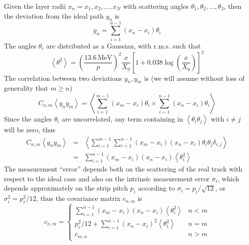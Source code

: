 \documentclass[10pt,a4paper]{article}
\begin{document}
Given the layer radii $x_n = x_1, x_2, \ldots, x_N$ with scattering angles $\theta_1, \theta_2, \ldots, \theta_3$, then
the deviation from the ideal path $y_n$ is
\begin{equation}
y_n=\sum_{i=1}^{n-1} \left (  x_n - x_i \right ) \theta_i
\end{equation}
The angles $\theta_i$ are distributed as a Gaussian, with r.m.s. such that
\begin{equation}
\left < \theta^2 \right > =
    \left ( \frac {13.6\,\mathrm{MeV}} {p} \right )^2
    \frac x {X_0}
    \left [ 1+ 0.038 \log \left ( \frac x {X_0} \right ) \right ] ^2
\end{equation}
The correlation between two deviations $y_n, y_m$ is (we will assume without loss of generality that $m \geq n$)
\begin{equation}
C_{n,m}\left < y_n y_m \right > =
      \left <
      \sum_{i=1}^{m-1} \left (  x_m - x_i \right ) \theta_i
      \times
      \sum_{i=1}^{n-1} \left (  x_n - x_i \right ) \theta_i
      \right >
\end{equation}
Since the angles $\theta_i$ are uncorrelated, any term containing in $\left < \theta_i \theta_j \right >$ with $i\neq j$ will be zero, thus
\begin{eqnarray}
C_{n,m}\left < y_n y_m \right > & = &
      \left <
      \sum_{i=1}^{m-1} \sum_{i=1}^{n-1}
      \left (  x_m - x_i \right )
      \left (  x_n - x_i \right ) \theta_i \theta_j \delta_{i,j}
      \right > \nonumber \\
      & = &
      \sum_{i=1}^{n-1} 
      \left (  x_m - x_i \right )
      \left (  x_n - x_i \right )  \left < \theta_i^2 \right > 
\end{eqnarray}
The measurement ``error'' depends both on the scattering of the real track with respect to the ideal case
and also on the intrinsic measurement error $\sigma_i$, which depends approximately on the strip pitch $p_i$
according to $\sigma_i = p_i / \sqrt{12}$, or $\sigma_i^2 = p_i^2 / 12$, thus the covariance matrix $c_{n,m}$ is
\begin{equation}
c_{n,m}= \left \{
\begin{array}{cl}
 \sum_{i=1}^{n-1} \left (  x_m - x_i \right ) \left (  x_n - x_i \right )  \left < \theta_i^2 \right > & n<m \\
 p_i^2 / 12 + \sum_{i=1}^{n-1} \left (  x_n - x_i \right )^2  \left < \theta_i^2 \right > & n=m \\
 c_{m,n}  & n>m
\end{array}
\right .
\end{equation}



\label{LastPage}
\end{document}
